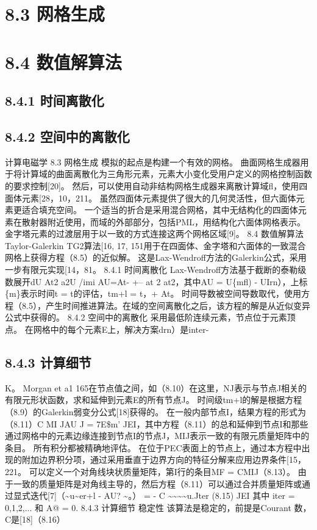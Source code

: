 \documentclass[UTF8,11pt,a4paper,openany,fontset=fandol]{ctexbook}
\begin{document}
\section{8.3 网格生成}
\section{8.4 数值解算法}
\subsection{8.4.1 时间离散化}
\subsection{8.4.2 空间中的离散化}
计算电磁学 8.3 网格生成 模拟的起点是构建一个有效的网格。 曲面网格生成器用于将计算域的曲面离散化为三角形元素，元素大小变化受用户定义的网格控制函数的要求控制[20]。 然后，可以使用自动非结构网格生成器来离散计算域fl，使用四面体元素[28，10，211。 虽然四面体元素提供了很大的几何灵活性，但六面体元素更适合填充空间。 一个适当的折合是采用混合网格，其中无结构化的四面体元素在散射器附近使用，而域的外部部分，包括PML，用结构化六面体网格表示。 金字塔元素的过渡层用于以一致的方式连接这两个网格区域[9]。 8.4 数值解算法 Taylor-Galerkin TG2算法[16, 17, 151用于在四面体、金字塔和六面体的一致混合网格上获得方程（8.5）的近似解。 这是Lax-Wendroff方法的Galerkin公式，采用一步有限元实现[14，81。 8.4.1 时间离散化 Lax-Wendroff方法基于截断的泰勒级数展开dU At2 a2U /imi AU=At- +-- at 2 at2，其中AU = U\{mfl) - UIrn），上标\{m\}表示时间t = t的评估，tm+l = t，+ At。 时间导数被空间导数取代，使用方程（8.5），产生时间推进算法。在域的空间离散化之后，该方程的解是从近似变异公式中获得的。 8.4.2 空间中的离散化 采用最低阶连续元素，节点位于元素顶点。 在网格中的每个元素E上，解决方案drn）是inter-

\subsection{8.4.3 计算细节}
K。 Morgan et a1 165在节点值之间，如（8.10）在这里，NJ表示与节点J相关的有限元形状函数，求和延伸到元素E的所有节点J。 时间级tm+l的解是根据方程（8.9）的Galerkin弱变分公式[18]获得的。 在一般内部节点I，结果方程的形式为（8.11）C MI JAU J = 7E\$m' JEI，其中方程（8.11）的总和延伸到节点I和那些通过网格中的元素边缘连接到节点I的节点J，MIJ表示一致的有限元质量矩阵中的条目。 所有积分都被精确地评估。 在位于PEC表面上的节点上，通过本方程中出现的附加边界积分项，通过采用垂直于边界方向的特征分解来应用边界条件[15，221。 可以定义一个对角线块状质量矩阵，第I行的条目MF = CMIJ（8.13）。 由于一致的质量矩阵是对角线主导的，然后方程（8.11）可以通过合并质量矩阵或通过显式迭代[7]（\textasciitilde{}u\textasciitilde{}er+l - AU? \textasciitilde{}。） = - C \textasciitilde{}\textasciitilde{}\textasciitilde{}\textasciitilde{}u.Jter (8.15) JEI 其中 iter = 0,1,2,... 和 A@ = 0. 8.4.3 计算细节 稳定性 该算法是稳定的，前提是Courant 数，C是[18]（8.16）
\end{document}
